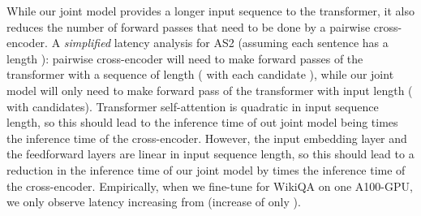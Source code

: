  While our joint model provides a longer input sequence to the transformer, it also reduces the number of forward passes that need to be done by a pairwise cross-encoder. A \emph{simplified} latency analysis for AS2 (assuming each sentence has a length ): pairwise cross-encoder will need to make  forward passes of the transformer with a sequence of length  ( with each candidate ), while our joint model will only need to make  forward pass of the transformer with input length  ( with  candidates). Transformer self-attention is quadratic in input sequence length, so this should lead to the inference time of out joint model being  times the inference time of the cross-encoder. However, the input embedding layer and the feedforward layers are linear in input sequence length, so this should lead to a reduction in the inference time of our joint model by  times the inference time of the cross-encoder. Empirically, when we fine-tune for WikiQA on one A100-GPU, we only observe latency increasing from  (increase of only ).